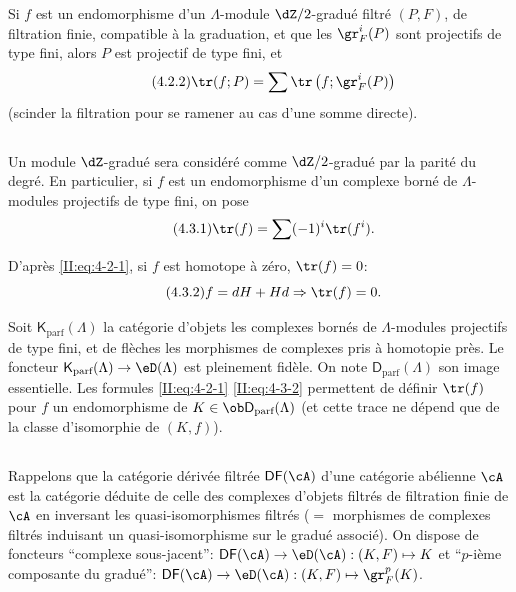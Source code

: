 Si $f$ est un endomorphisme d'un $\Lambda$-module $\dZ/2$-gradué filtré 
$(P,F)$, de filtration finie, compatible à la graduation, et que les 
$\gr_F^i(P)$ sont projectifs de type fini, alors $P$ est projectif de type 
fini, et 
\begin{equation*}\tag{4.2.2}\label{II:eq:4-2-2}
  \tr(f;P) = \sum \tr\left(f; \gr_F^i(P) \right)
\end{equation*}
(scinder la filtration pour se ramener au cas d'une somme directe). 





\subsection{}\label{II:4-3}

Un module $\dZ$-gradué sera considéré comme $\dZ/2$-gradué par la 
parité du degré. En particulier, si $f$ est un endomorphisme d'un complexe 
borné de $\Lambda$-modules projectifs de type fini, on pose 
\begin{equation*}\tag{4.3.1}\label{II:eq:4-3-1}
  \tr(f) = \sum (-1)^i \tr(f^i) \text{.}
\end{equation*}

D'après \eqref{II:eq:4-2-1}, si $f$ est homotope à zéro, $\tr(f) = 0$: 
\begin{equation*}\tag{4.3.2}\label{II:eq:4-3-2}
  f = d H + H d \Rightarrow \tr(f) = 0 \text{.}
\end{equation*}

Soit $\mathsf{K}_\text{parf}(\Lambda)$ la catégorie d'objets les complexes 
bornés de $\Lambda$-modules projectifs de type fini, et de flèches les 
morphismes de complexes pris à homotopie près. Le foncteur 
$\mathsf{K}_\text{parf}(\Lambda)\to\eD(\Lambda)$ est pleinement fidèle. On note 
$\mathsf{D}_\text{parf}(\Lambda)$ son image essentielle. Les formules 
\eqref{II:eq:4-2-1} \eqref{II:eq:4-3-2} permettent de définir $\tr(f)$ pour $f$ 
un endomorphisme de $K\in\ob \mathsf{D}_\text{parf}(\Lambda)$ (et cette trace ne 
dépend que de la classe d'isomorphie de $(K,f)$). 





\subsection{}\label{II:4-4}

Rappelons que la catégorie dérivée filtrée $\mathsf{DF}(\cA)$ d'une catégorie 
abélienne $\cA$ est la catégorie déduite de celle des complexes d'objets 
filtrés de filtration finie de $\cA$ en inversant les quasi-isomorphismes 
filtrés ($=$ morphismes de complexes filtrés induisant un quasi-isomorphisme 
sur le gradué associé). On dispose de foncteurs ``complexe sous-jacent'': 
$\mathsf{DF}(\cA)\to\eD(\cA): (K,F)\mapsto K$ et ``$p$-ième composante du 
gradué'': $\mathsf{DF}(\cA)\to\eD(\cA): (K,F)\mapsto \gr_F^p(K)$. 

